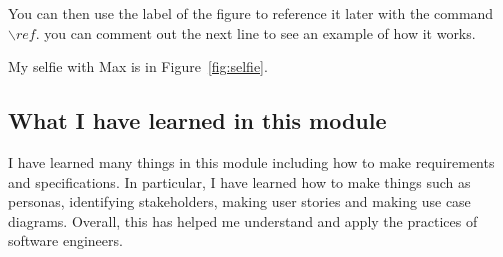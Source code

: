 You can then use the label of the figure to reference it later with the command ${\backslash}ref.$ you can comment out the next line to see an example of how it works.

My selfie with Max is in  Figure~\ref{fig:selfie}.

\subsection{What I have learned in this module}
I have learned many things in this module including how to make requirements and specifications. In particular, I have learned how to make things such as personas, identifying stakeholders, making user stories and making use case diagrams. Overall, this has helped me understand and apply the practices of software engineers.

